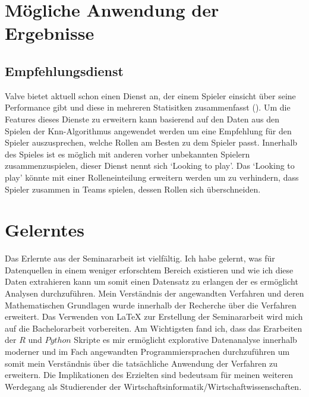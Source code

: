 \documentclass[envcountsame, envcountchap, deutsch]{i-studis}
\begin{document}
\section{Mögliche Anwendung der Ergebnisse}
\subsection{Empfehlungsdienst}
Valve bietet aktuell schon einen Dienst an, der einem Spieler einsicht über seine Performance gibt und diese in mehreren Statisitken zusammenfasst (\cite{Corporation_2021}).
Um die Features dieses Dienste zu erweitern kann basierend auf den Daten aus den Spielen der Knn-Algorithmus angewendet werden um eine Empfehlung für den Spieler
auszusprechen, welche Rollen am Besten zu dem Spieler passt. Innerhalb des Spieles ist es möglich mit anderen vorher unbekannten Spielern zusammenzuspielen, 
dieser Dienst nennt sich `Looking to play'. Das `Looking to play' könnte mit einer Rolleneinteilung erweitern werden um zu verhindern,
dass Spieler zusammen in Teams spielen, dessen Rollen sich überschneiden.
\section{Gelerntes}
Das Erlernte aus der Seminararbeit ist vielfältig. Ich habe gelernt, was für Datenquellen in einem weniger erforschtem Bereich existieren 
und wie ich diese Daten extrahieren kann um somit einen Datensatz zu erlangen der es ermöglicht Analysen durchzuführen. 
Mein Verständnis der angewandten Verfahren und deren Mathematischen Grundlagen wurde innerhalb der Recherche über die Verfahren erweitert. Das Verwenden von
\LaTeX{} zur Erstellung der Seminararbeit wird mich auf die Bachelorarbeit vorbereiten. Am Wichtigsten fand ich, dass das Erarbeiten der $R$ und $Python$ Skripte es mir ermöglicht 
explorative Datenanalyse innerhalb moderner und im Fach angewandten Programmiersprachen durchzuführen um somit mein Verständnis über die tatsächliche Anwendung der Verfahren
zu erweitern. Die Implikationen des Erzielten sind bedeutsam für meinen weiteren Werdegang als Studierender der Wirtschaftsinformatik/Wirtschaftwissenschaften.



\backmatter{}
\printbibliography{}
\printindex												%
\begin{appendix}

\printnoidxglossaries{}

\end{appendix}
\end{document}
